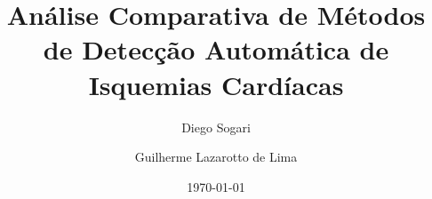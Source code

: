
\title[Trabalho de Graduação II]{
    Análise Comparativa de Métodos de Detecção Automática de Isquemias Cardíacas
}
\author[D. Sogari]{
    Diego Sogari \and Guilherme Lazarotto de Lima
}
\date[2014]{\today}

\frame{\maketitle}